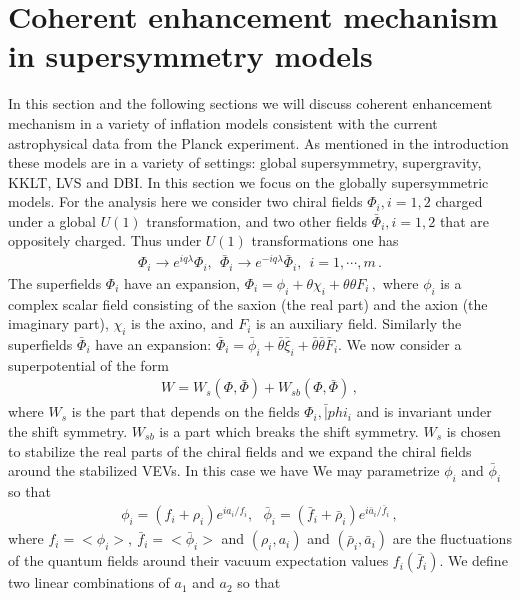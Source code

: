 \documentclass[12pt]{article}
\begin{document}
\section{Coherent enhancement mechanism in supersymmetry models \label{sec:Supersymmetry}}
In this section and the following sections we will discuss coherent enhancement mechanism in a variety of inflation models consistent with the current astrophysical data
from the Planck experiment. As mentioned in the introduction these models are in a variety of settings: global supersymmetry, supergravity,
KKLT, LVS and DBI. In this section we focus on the globally supersymmetric models.
For the analysis here we consider two chiral fields $\Phi_i, i=1,2$ charged under a global $U(1)$
transformation, and two other fields $\bar\Phi_i, i=1,2$ that are oppositely charged.
Thus under $U(1)$ transformations one
has
\begin{align}
  \Phi_i\to e^{i q \lambda} \Phi_i, ~~\bar \Phi_i\to e^{-i q \lambda} \bar \Phi_i, ~~i=1, \cdots, m\,.
\end{align}
The superfields ${\Phi}_{i}$ have an expansion,
${\Phi}_{i} = {\phi}_{i} + \theta {\chi}_{i} + \theta \theta {F}_{i}\,,$
where ${\phi}_{i}$ is a complex scalar field consisting of the saxion (the real part) and the axion (the imaginary
part), ${\chi}_{i}$ is the axino, and ${F}_{i}$ is an auxiliary field.
Similarly the superfields $\bar {\Phi}_{i}$ have an expansion:
$\bar {\Phi}_{i} = \bar {\phi}_{i} + \bar \theta \bar {\xi}_{i} + \bar\theta \bar \theta \bar{F}_{i}$.
We now consider a superpotential of the form
\begin{align}
  W = W_s(\Phi,\bar \Phi) + W_ {sb} (\Phi, \bar \Phi)\,,
  \label{wsn}
\end{align}
where $W_s$ is the part that depends on the fields $\Phi_i, \bar |phi_i$ and is invariant under the shift symmetry.
$W_{sb}$ is a part which breaks the shift symmetry. $W_s$ is chosen to stabilize the real parts of the chiral fields
and we expand the chiral fields around the stabilized VEVs. In this case we have
We may parametrize $\phi_i$ and $\bar \phi_i$ so that
\begin{align}
  \phi_i = (f_i + \rho_i) e^{ia_i/f_i}, ~~~\bar\phi_i = (\bar f_i + \bar \rho_i) e^{i\bar a_i/\bar f_i}\,,
\end{align}
where $f_i= <\phi_i> ,~\bar f_i= <\bar\phi_i>$ and $(\rho_i, a_i)$ and $(\bar \rho_i, \bar a_i)$
are the fluctuations of the quantum fields around their vacuum expectation values $f_i(\bar f_i)$.
We define two linear combinations of $a_1$ and $a_2$ so that
\end{document}
